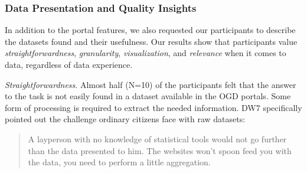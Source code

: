 \documentclass{sigchi}
\begin{document}


\subsubsection{Data Presentation and Quality Insights}
In addition to the portal features, we also requested our participants to describe the datasets found and their usefulness. Our results show that participants value \textit{straightforwardness}, \textit{granularity}, \textit{visualization}, and \textit{relevance} when it comes to data, regardless of data experience.

\textit{Straightforwardness}. Almost half (N=10) of the participants felt that the answer to the task is not easily found in a dataset available in the OGD portals. Some form of processing is required to extract the needed information. DW7 specifically pointed out the challenge ordinary citizens face with raw datasets:
\begin{quote}
A layperson with no knowledge of statistical tools would not go further than the data presented to him. The websites won't spoon feed you with the data, you need to perform a little aggregation.
\end{quote}
\end{document}
